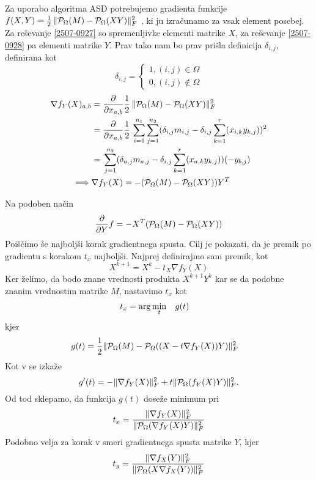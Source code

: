 Za uporabo algoritma ASD potrebujemo gradienta funkcije $f(X,Y) = \frac{1}{2}\, \lVert\mathcal{P}_\Omega(M) - \mathcal{P}_\Omega(XY)\rVert_F^2$ , ki ju izračunamo za vsak element posebej.
Za reševanje \eqref{2507-0927} so spremenljivke elementi matrike $X$,
za reševanje \eqref{2507-0928} pa elementi matrike $Y$.  Prav tako nam bo prav prišla definicija $\delta_{i, j}$, definirana kot
\[
    \delta_{i,j} = \begin{cases}
        1, (i, j) \in \Omega \\
        0, (i, j) \notin \Omega
    \end{cases}
\]
\begin{align*}
    \nabla f_Y(X)_{a,b} &= \frac{\partial}{\partial x_{a,b}} \frac{1}{2}\, \lVert\mathcal{P}_\Omega(M) - \mathcal{P}_\Omega(XY)\rVert_F^2  \\
    &= \frac{\partial}{\partial x_{a,b}} \frac{1}{2}\, \sum_{i=1}^{n_1}\sum_{j=1}^{n_2}(\delta_{i,j}m_{i,j} - \delta_{i,j}\sum_{k=1}^{r}(x_{i,k}y_{k,j}))^2  \\
    &= \, \sum_{j=1}^{n_2}(\delta_{a,j}m_{a,j} - \delta_{i,j}\sum_{k=1}^{r}(x_{a,k}y_{k,j}))(-y_{b,j}) \\
    \implies &\nabla f_Y(X) = -(\mathcal{P}_\Omega(M) - \mathcal{P}_\Omega(XY))Y^T
\end{align*}

Na podoben način 
\[
    \frac{\partial}{\partial Y}f = -X^T (\mathcal{P}_\Omega(M) - \mathcal{P}_\Omega(XY))
\]
Poiščimo še najboljši korak gradientnega spusta.
Cilj je pokazati, da je premik po gradientu s korakom $t_x$ najboljši.
Najprej definirajmo sam premik, kot
\[
    X^{k+1} = X^k - t_X \nabla f_Y(X)
\]
Ker želimo, da bodo znane vrednosti produkta $X^{k+1}Y^{k}$ kar se da podobne znanim vrednostim matrike $M$, nastavimo $t_x$ kot 
\begin{align*}
    t_x &= \arg \min_t \hspace{0.3cm} g(t)
\end{align*} kjer
\begin{align*}
    g(t) &= \frac{1}{2} \lVert\mathcal{P}_\Omega(M) - \mathcal{P}_\Omega((X - t\nabla f_Y(X))Y)\rVert_F^2
\end{align*}
Kot v \cite{AST-TK15} se izkaže
\[
  g'(t) = -\lVert\nabla f_Y(X)\rVert_F^2 + t\lVert\mathcal{P}_\Omega(f_Y(X)Y)\rVert_F^2. 
\]
Od tod sklepamo, da funkcija $g(t)$ doseže minimum pri 
\[
  t_x = \frac{\lVert\nabla f_Y(X)\rVert_F^2}{\lVert\mathcal{P}_\Omega(\nabla f_Y(X)Y)\rVert_F^2}  
\]
Podobno velja za korak v smeri gradientnega spusta matrike $Y$, kjer
\[
  t_y = \frac{\lVert\nabla f_X(Y)\rVert_F^2}{\lVert\mathcal{P}_\Omega(X \nabla f_X(Y))\rVert_F^2}  
\]

